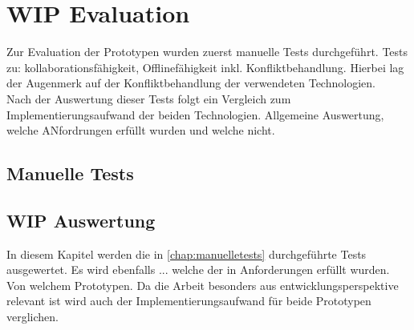 \chapter{\label{chap:evaluation}WIP Evaluation}
Zur Evaluation der Prototypen wurden zuerst manuelle Tests durchgeführt. 
Tests zu: kollaborationsfähigkeit, Offlinefähigkeit inkl. Konfliktbehandlung.
Hierbei lag der Augenmerk auf der  Konfliktbehandlung der verwendeten Technologien.\\
Nach der Auswertung dieser Tests folgt ein Vergleich zum Implementierungsaufwand der beiden Technologien.
Allgemeine Auswertung, welche ANfordrungen erfüllt wurden und welche nicht.
%
%
\section{\label{chap:manuelletests}Manuelle Tests}

%
%
\section{\label{chap:auswertung}WIP Auswertung}
In diesem Kapitel werden die in \autoref{chap:manuelletests} durchgeführte Tests ausgewertet.
Es wird ebenfalls ... welche der in Anforderungen erfüllt wurden. Von welchem Prototypen.
Da die Arbeit besonders aus entwicklungsperspektive relevant ist wird auch der Implementierungsaufwand für beide Prototypen verglichen.
